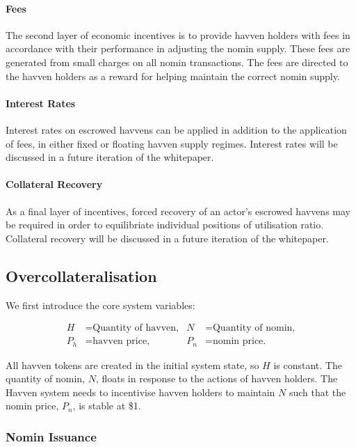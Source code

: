 \paragraph{Fees}

\noindent The second layer of economic incentives is to provide havven holders with fees in accordance with their performance in adjusting the nomin supply. These fees are generated from small charges on all nomin transactions. The fees are directed to the havven holders as a reward for helping maintain the correct nomin supply.

\paragraph{Interest Rates}

\noindent Interest rates on escrowed havvens can be applied in addition to the application of fees, in either fixed or floating havven supply regimes. Interest rates will be discussed in a future iteration of the whitepaper.

\paragraph{Collateral Recovery}

\noindent As a final layer of incentives, forced recovery of an actor's escrowed havvens may be required in order to equilibriate individual positions of utilisation ratio. Collateral recovery will be discussed in a future iteration of the whitepaper.

\subsection{Overcollateralisation}

\noindent We first introduce the core system variables:

\begin{align*}
H &= \text{Quantity of havven,} & N &= \text{Quantity of nomin,} \\
P_h &= \text{havven price,}  & P_n &= \text{nomin price.}
\end{align*}

\noindent All havven tokens are created in the initial system state, so $H$ is constant. The quantity of nomin, $N$, floats in response to the actions of havven holders. The Havven system needs to incentivise havven holders to maintain $N$ such that the nomin price, $P_n$, is stable at \$1.

\subsubsection{Nomin Issuance}

